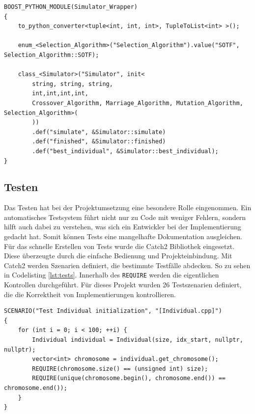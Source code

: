 \begin{minipage}{\linewidth}
\begin{lstlisting}[caption={C++ zu Python Schnittstelle}, firstnumber=1, captionpos=b, label=lst:boostpython]
BOOST_PYTHON_MODULE(Simulator_Wrapper)
{
	to_python_converter<tuple<int, int, int>, TupleToList<int> >();

	enum_<Selection_Algorithm>("Selection_Algorithm").value("SOTF", Selection_Algorithm::SOTF);

	class_<Simulator>("Simulator", init<
		string, string, string,
		int,int,int,int,
		Crossover_Algorithm, Marriage_Algorithm, Mutation_Algorithm, Selection_Algorithm>(
		))
 		.def("simulate", &Simulator::simulate)
		.def("finished", &Simulator::finished)
		.def("best_individual", &Simulator::best_individual);
}
\end{lstlisting}
\end{minipage}
\subsection{Testen}
Das Testen hat bei der Projektumsetzung eine besondere Rolle eingenommen. Ein automatisches Testsystem führt nicht nur zu Code mit weniger Fehlern, sondern hilft auch dabei zu verstehen, was sich ein Entwickler bei der Implementierung gedacht hat. Somit können Tests eine mangelhafte Dokumentation ausgleichen.\\
Für das schnelle Erstellen von Tests wurde die Catch2 Bibliothek eingesetzt. Diese überzeugte durch die einfache Bedienung und Projekteinbindung.
Mit Catch2 werden Szenarien definiert, die bestimmte Testfälle abdecken. So zu sehen in Codelisting \ref{lst:tests}. Innerhalb des \texttt{REQUIRE} werden die eigentlichen Kontrollen durchgeführt.
Für dieses Projekt wurden 26 Testszenarien definiert, die die Korrektheit von Implementierungen kontrollieren.
\begin{minipage}{\linewidth}
\begin{lstlisting}[caption={Unit-Tests}, firstnumber=1, captionpos=b, label=lst:tests]
SCENARIO("Test Individual initialization", "[Individual.cpp]")
{
	for (int i = 0; i < 100; ++i) {
		Individual individual = Individual(size, idx_start, nullptr, nullptr);
		vector<int> chromosome = individual.get_chromosome();
		REQUIRE(chromosome.size() == (unsigned int) size);
		REQUIRE(unique(chromosome.begin(), chromosome.end()) == chromosome.end());
	}
}
\end{lstlisting}
\end{minipage}
